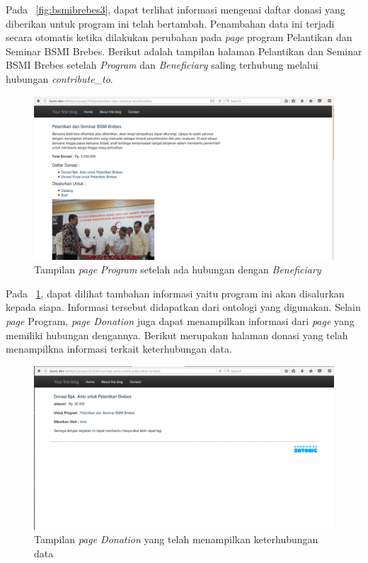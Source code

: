 Pada \pic~\ref{fig:bsmibrebes3}, dapat terlihat informasi mengenai daftar donasi yang diberikan untuk program ini telah bertambah. Penambahan data ini terjadi secara otomatis ketika dilakukan perubahan pada \textit{page} program Pelantikan dan Seminar BSMI Brebes. Berikut adalah tampilan halaman Pelantikan dan Seminar BSMI Brebes setelah \textit{Program} dan \textit{Beneficiary} saling terhubung melalui hubungan \textit{contribute\_to}.

\begin{figure}
	\centering
	\includegraphics[width=1\textwidth]
	{pics/51-bsmibrebes.png}
	\caption{Tampilan \textit{page Program} setelah ada hubungan dengan \textit{Beneficiary}}
	\label{fig:bsmibrebes4}
\end{figure}
\vspace{-0.3cm}

Pada \pic~\ref{fig:bsmibrebes4}, dapat dilihat tambahan informasi yaitu program ini akan disalurkan kepada siapa. Informasi tersebut didapatkan dari ontologi yang digunakan. Selain \textit{page} Program, \textit{page Donation} juga dapat menampilkan informasi dari \textit{page} yang memiliki hubungan dengannya. Berikut merupakan halaman donasi yang telah menampilkna informasi terkait keterhubungan data.

\begin{figure}
	\centering
	\includegraphics[width=1\textwidth]
	{pics/52-donasiantobrebes.png}
	\caption{Tampilan \textit{page Donation} yang telah menampilkan keterhubungan data}
	\label{fig:donasi1brebes}
\end{figure}
\vspace{-0.3cm}

